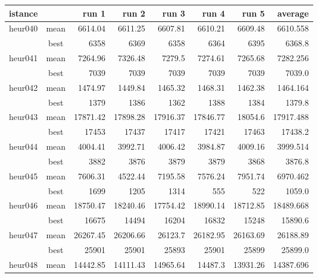 \documentclass[a4paper,12pt]{article}
\begin{document}
\begin{table}[H]
    \centering
    \begin{tabular}{l|c|r|r|r|r|r|r}
        istance  &   & run 1     & run 2  & run 3     & run 4     & run 5  & average \\ %
        \hline
        heur040 & mean & 6614.04 & 6611.25 & 6607.81 & 6610.21 & 6609.48 & 6610.558\\
                & best & 6358 & 6369 & 6358 & 6364 & 6395 & 6368.8 \\
        \hline
        heur041 & mean & 7264.96 & 7326.48 & 7279.5 & 7274.61 & 7265.68  & 7282.256 \\
                & best & 7039    & 7039    & 7039    & 7039    & 7039    & 7039.0  \\
        \hline
        heur042 & mean & 1474.97 & 1449.84 & 1465.32 & 1468.31 & 1462.38 & 1464.164 \\
                & best & 1379 & 1386 & 1362 & 1388 & 1384  & 1379.8 \\
        \hline
        heur043 & mean & 17871.42 & 17898.28 & 17916.37 & 17846.77 & 18054.6  & 17917.488 \\
                & best & 17453 & 17437 & 17417 & 17421 & 17463 &  17438.2 \\
        \hline
        heur044 & mean & 4004.41 & 3992.71 & 4006.42 & 3984.87 & 4009.16 & 3999.514\\
                & best & 3882 & 3876 & 3879 & 3879 & 3868 & 3876.8 \\
        \hline
        heur045 & mean & 7606.31 & 4522.44 & 7195.58 & 7576.24 & 7951.74 & 6970.462\\
                & best & 1699 & 1205 & 1314 & 555 & 522 & 1059.0\\
        \hline
        heur046 & mean & 18750.47 & 18240.46 & 17754.42 & 18990.14 & 18712.85 & 18489.668 \\
                & best & 16675 & 14494 & 16204 & 16832 & 15248 & 15890.6 \\
        \hline
        heur047 & mean & 26267.45 & 26206.66 & 26123.7 & 26182.95 & 26163.69 & 26188.89\\
                & best & 25901 & 25901 & 25893 & 25901 & 25899 & 25899.0 \\
        \hline
        heur048 & mean & 14442.85 & 14111.43 & 14965.64 & 14487.3 & 13931.26 & 14387.696 \\

\end{tabular}
\end{table}
\end{document}
